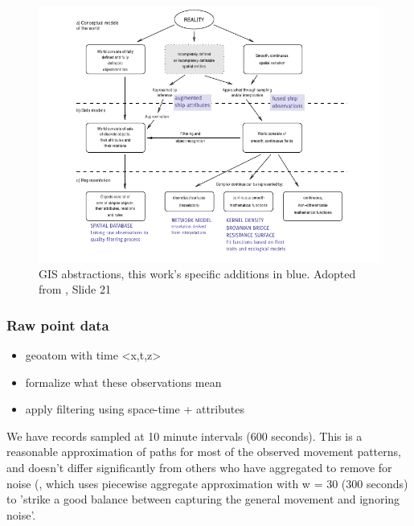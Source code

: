 \begin{figure}[htbp]
  \centering
  \includegraphics[width=160mm]{figures/representation-in-gis.pdf}
  \caption{GIS abstractions, this work's specific {\color{DBlue} additions in blue}. Adopted from \cite{Bivand2011}, Slide 21}
  \label{fig:representation-in-gis}
\end{figure}




\subsubsection{Raw point data}
 \begin{itemize}
   \item geoatom with time <x,t,z>
   \item formalize what these observations mean
   \item apply filtering using space-time + attributes
 \end{itemize}

We have records sampled at 10 minute intervals (600 seconds). This is a reasonable approximation of paths for most of the observed movement patterns, and doesn't differ significantly from others who have aggregated to remove for noise (\cite{Vries2009}, which uses piecewise aggregate approximation with w = 30 (300 seconds) to 'strike a good balance between capturing the general movement and ignoring noise'. %

